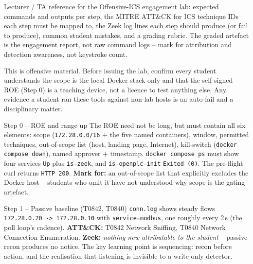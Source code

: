 \documentclass[11pt,a4paper]{article}
\begin{document}
\labheader

\begin{goalbox}
Lecturer / TA reference for the Offensive-ICS engagement lab: expected
commands and outputs per step, the MITRE ATT\&CK for ICS technique IDs
each step must be mapped to, the Zeek log lines each step should
produce (or fail to produce), common student mistakes, and a grading
rubric. The graded artefact is the engagement report, not raw command
logs -- mark for attribution and detection awareness, not keystroke
count.
\end{goalbox}

\begin{warnbox}
This is offensive material. Before issuing the lab, confirm every
student understands the scope is the local Docker stack only and that
the self-signed ROE (Step 0) is a teaching device, not a licence to
test anything else. Any evidence a student ran these tools against
non-lab hosts is an auto-fail and a disciplinary matter.
\end{warnbox}

\begin{solutionbox}{Step 0 -- ROE and range up}
The ROE need not be long, but must contain all six elements: scope
(\texttt{172.28.0.0/16} + the five named containers), window,
permitted techniques, out-of-scope list (host, landing page,
Internet), kill-switch (\texttt{docker compose down}), named approver +
timestamp. \texttt{docker compose ps} must show four services
\texttt{Up} plus \texttt{is-zeek}, and \texttt{is-openplc-init}
\texttt{Exited (0)}. The pre-flight curl returns \texttt{HTTP 200}.
\textbf{Mark for:} an out-of-scope list that explicitly excludes the
Docker host -- students who omit it have not understood why scope is
the gating artefact.
\end{solutionbox}

\begin{solutionbox}{Step 1 -- Passive baseline (T0842, T0840)}
\texttt{conn.log} shows steady flows \texttt{172.28.0.20 ->
172.28.0.10} with \texttt{service=modbus}, one roughly every 2\,s
(the poll loop's cadence). \textbf{ATT\&CK:} T0842 Network Sniffing,
T0840 Network Connection Enumeration. \textbf{Zeek:} \emph{nothing new
attributable to the student} -- passive recon produces no notice. The
key learning point is sequencing: recon before action, and the
realisation that listening is invisible to a write-only detector.
\end{solutionbox}
\end{document}
